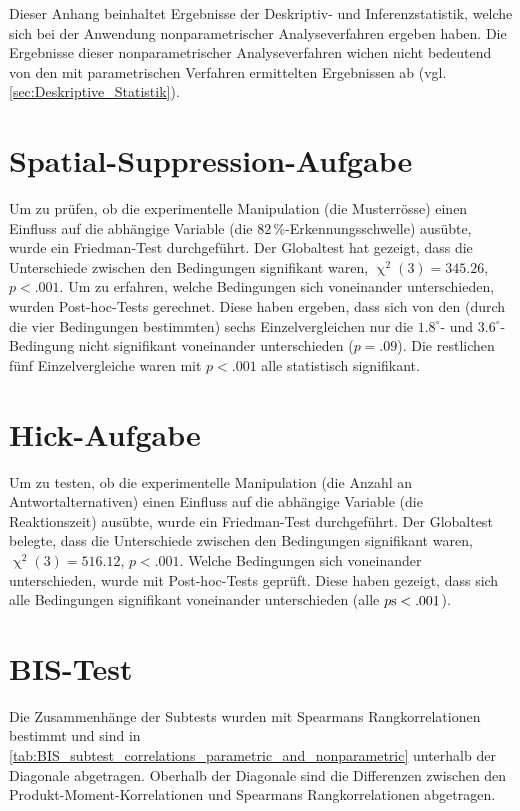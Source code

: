 \documentclass[11pt, twoside, a4paper]{book}		%
\begin{document}
Dieser Anhang beinhaltet Ergebnisse der Deskriptiv- und Inferenzstatistik, welche sich bei der Anwendung nonparametrischer Analyseverfahren ergeben haben. Die Ergebnisse dieser nonparametrischer Analyseverfahren wichen nicht bedeutend von den mit parametrischen Verfahren ermittelten Ergebnissen ab (vgl. \autoref{sec:Deskriptive_Statistik}).

\section{Spatial-Suppression-Aufgabe}

Um zu prüfen, ob die experimentelle Manipulation (die Musterrösse) einen Einfluss auf die abhängige Variable (die $82\,\%$-Er\-ken\-nungs\-schwel\-le) ausübte, wurde ein Friedman-Test durchgeführt. Der Globaltest hat gezeigt, dass die Unterschiede zwischen den Bedingungen signifikant waren, $\upchi^2(3)=345.26$, $p<.001$. 
Um zu erfahren, welche Bedingungen sich voneinander unterschieden, wurden Post-hoc-Tests \citep{Galili2010, Hollander2014} gerechnet. Diese haben ergeben, dass sich von den (durch die vier Bedingungen bestimmten) sechs Einzelvergleichen nur die $1.8^{\circ}$- und $3.6^{\circ}$-Bedingung nicht signifikant voneinander unterschieden ($p=.09$). Die restlichen fünf Einzelvergleiche waren mit $p<.001$ alle statistisch signifikant.

\section{Hick-Aufgabe}

Um zu testen, ob die experimentelle Manipulation (die Anzahl an Antwortalternativen) einen Einfluss auf die abhängige Variable (die Reaktionszeit) ausübte, wurde ein Friedman-Test durchgeführt. Der Globaltest belegte, dass die Unterschiede zwischen den Bedingungen signifikant waren, $\upchi^2(3)=516.12$, $p<.001$. Welche Bedingungen sich voneinander unterschieden, wurde mit Post-hoc-Tests \citep{Galili2010, Hollander2014} geprüft. Diese haben gezeigt, dass sich alle Bedingungen signifikant voneinander unterschieden (alle $p\textnormal{s}<.001$). 

\section{BIS-Test}

Die Zusammenhänge der Subtests wurden mit Spearmans Rangkorrelationen bestimmt und sind in \autoref{tab:BIS_subtest_correlations_parametric_and_nonparametric} unterhalb der Diagonale abgetragen. Oberhalb der Diagonale sind die Differenzen zwischen den Produkt-Moment-Korrelationen und Spearmans Rangkorrelationen abgetragen.
\end{document}
